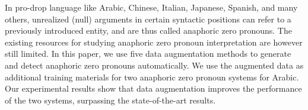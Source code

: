 In pro-drop language like Arabic, Chinese, Italian, Japanese,  Spanish,  and many others, unrealized (null) arguments in certain syntactic positions can refer to a previously introduced entity, and are thus called anaphoric zero pronouns. The existing resources for studying anaphoric zero pronoun interpretation are however still limited. In this paper, we use five data augmentation methods to generate and detect anaphoric zero pronouns automatically. We use the augmented  data as additional training materials for  two anaphoric zero pronoun systems for Arabic. Our experimental results show that data augmentation improves the performance of the two systems, surpassing the state-of-the-art results.

